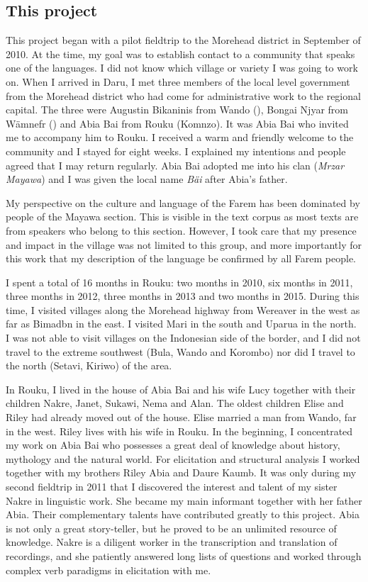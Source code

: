 \subsection{This project}\label{thisproject}
\largerpage
This project began with a pilot fieldtrip to the Morehead district in September of 2010. At the time, my goal was to establish contact to a community that speaks one of the  languages. I did not know which village or variety I was going to work on. When I arrived in Daru, I met three members of the local level government from the Morehead district who had come for administrative work to the regional capital. The three were Augustin Bikaninis from Wando (), Bongai Njyar from Wämnefr () and Abia Bai from Rouku (Komnzo). It was Abia Bai who invited me to accompany him to Rouku. I received a warm and friendly welcome to the community and I stayed for eight weeks. I explained my intentions and people agreed that I may return regularly. Abia Bai adopted me into his clan (\emph{Mrzar Mayawa}) and I was given the local name \emph{Bäi} after Abia's father.

My perspective on the culture and language of the Farem has been dominated by people of the Mayawa section. This is visible in the text corpus as most texts are from speakers who belong to this section. However, I took care that my presence and impact in the village was not limited to this group, and {\textendash} more importantly for this work {\textendash} that my description of the language be confirmed by all Farem people.

I spent a total of 16 months in Rouku: two months in 2010, six months in 2011, three months in 2012, three months in 2013 and two months in 2015. During this time, I visited villages along the Morehead highway from Wereaver in the west as far as Bimadbn in the east. I visited Mari in the south and Uparua in the north. I was not able to visit villages on the Indonesian side of the border, and I did not travel to the extreme southwest (Bula, Wando and Korombo) nor did I travel to the north (Setavi, Kiriwo) of the area.

In Rouku, I lived in the house of Abia Bai and his wife Lucy together with their children Nakre, Janet, Sukawi, Nema and Alan. The oldest children Elise and Riley had already moved out of the house. Elise married a man from Wando, far in the west. Riley lives with his wife in Rouku. In the beginning, I concentrated my work on Abia Bai who possesses a great deal of knowledge about history, mythology and the natural world. For elicitation and structural analysis I worked together with my brothers Riley Abia and Daure Kaumb. It was only during my second fieldtrip in 2011 that I discovered the interest and talent of my sister Nakre in linguistic work. She became my main informant together with her father Abia. Their complementary talents have contributed greatly to this project. Abia is not only a great story-teller, but he proved to be an unlimited resource of knowledge. Nakre is a diligent worker in the transcription and translation of recordings, and she patiently answered long lists of questions and worked through complex verb paradigms in elicitation with me.

